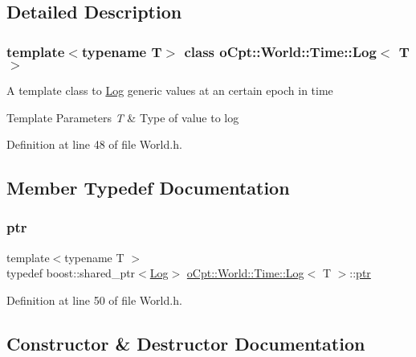 \subsection{Detailed Description}
\subsubsection*{template$<$typename T$>$\newline
class o\+Cpt\+::\+World\+::\+Time\+::\+Log$<$ T $>$}

A template class to \hyperlink{classo_cpt_1_1_world_1_1_time_1_1_log}{Log} generic values at an certain epoch in time 
\begin{DoxyTemplParams}{Template Parameters}
{\em T} & Type of value to log \\
\hline
\end{DoxyTemplParams}


Definition at line 48 of file World.\+h.



\subsection{Member Typedef Documentation}
\hypertarget{classo_cpt_1_1_world_1_1_time_1_1_log_ac60728a183e1d17aa602cdc78fe2a6f5}{}\label{classo_cpt_1_1_world_1_1_time_1_1_log_ac60728a183e1d17aa602cdc78fe2a6f5} 
\subsubsection{\texorpdfstring{ptr}{ptr}}
{\footnotesize\ttfamily template$<$typename T $>$ \\
typedef boost\+::shared\+\_\+ptr$<$\hyperlink{classo_cpt_1_1_world_1_1_time_1_1_log}{Log}$>$ \hyperlink{classo_cpt_1_1_world_1_1_time_1_1_log}{o\+Cpt\+::\+World\+::\+Time\+::\+Log}$<$ T $>$\+::\hyperlink{classo_cpt_1_1_world_1_1_time_1_1_log_ac60728a183e1d17aa602cdc78fe2a6f5}{ptr}}



Definition at line 50 of file World.\+h.



\subsection{Constructor \& Destructor Documentation}
\hypertarget{classo_cpt_1_1_world_1_1_time_1_1_log_ac4bd19f2963c6f708a7578e4c23bf1d4}{}\label{classo_cpt_1_1_world_1_1_time_1_1_log_ac4bd19f2963c6f708a7578e4c23bf1d4} 
